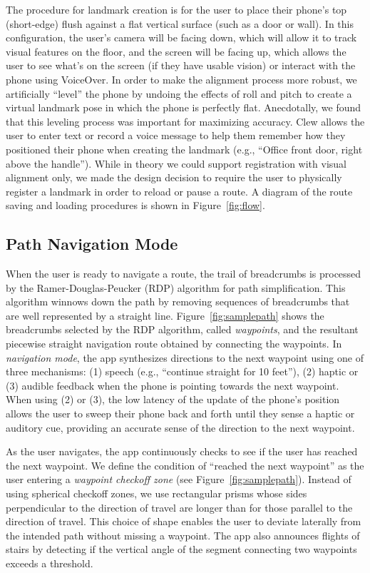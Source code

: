 \documentclass[chi]{sigchi}
\begin{document}
The procedure for landmark creation is for the user to place their phone's top (short-edge) flush against a flat vertical surface (such as a door or wall).  In this configuration, the user's camera will be facing down, which will allow it to track visual features on the floor, and the screen will be facing up, which allows the user to see what's on the screen (if they have usable vision) or interact with the phone using VoiceOver.  In order to make the alignment process more robust, we artificially ``level'' the phone by undoing the effects of roll and pitch to create a virtual landmark pose in which the phone is perfectly flat.  Anecdotally, we found that this leveling process was important for maximizing accuracy.  Clew allows the user to enter text or record a voice message to help them remember how they positioned their phone when creating the landmark (e.g., ``Office front door, right above the handle'').  While in theory we could support registration with visual alignment only, we made the design decision to require the user to physically register a landmark in order to reload or pause a route.  A diagram of the route saving and loading procedures is shown in Figure~\ref{fig:flow}.

\subsection{Path Navigation Mode}\label{sec:pathnavigationmode}

When the user is ready to navigate a route, the trail of breadcrumbs is processed by the Ramer-Douglas-Peucker (RDP) algorithm \cite{douglas1973algorithms} for path simplification.  This algorithm winnows down the path by removing sequences of breadcrumbs that are well represented by a straight line.  Figure~\ref{fig:samplepath} shows the breadcrumbs selected by the RDP algorithm, called \emph{waypoints}, and the resultant piecewise straight navigation route obtained by connecting the waypoints.  In \emph{navigation mode}, the app synthesizes directions to the next waypoint using one of three mechanisms: (1) speech (e.g., ``continue straight for 10 feet''), (2) haptic or (3) audible feedback when the phone is pointing towards the next waypoint.  When using (2) or (3), the low latency of the update of the phone's position allows the user to sweep their phone back and forth until they sense a haptic or auditory cue, providing an accurate sense of the direction to the next waypoint.

As the user navigates, the app continuously checks to see if the user has reached the next waypoint.  We define the condition of ``reached the next waypoint'' as the user entering a \emph{waypoint checkoff zone} (see Figure~\ref{fig:samplepath}).  Instead of using spherical checkoff zones, we use rectangular prisms whose sides perpendicular to the direction of travel are longer than for those parallel to the direction of travel.  This choice of shape enables the user to deviate laterally from the intended path without missing a waypoint.  The app also announces flights of stairs by detecting if the vertical angle of the segment connecting two waypoints exceeds a threshold.
\end{document}
